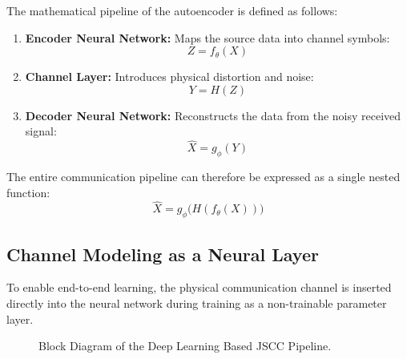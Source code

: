 \documentclass[10pt, conference]{IEEEtran}
\begin{document}
The mathematical pipeline of the autoencoder is defined as follows:
\begin{enumerate}
    \item \textbf{Encoder Neural Network:} Maps the source data into channel symbols:
    \begin{equation}
        Z = f_\theta(X)
    \end{equation}
    \item \textbf{Channel Layer:} Introduces physical distortion and noise:
    \begin{equation}
        Y = H(Z)
    \end{equation}
    \item \textbf{Decoder Neural Network:} Reconstructs the data from the noisy received signal:
    \begin{equation}
        \hat{X} = g_\phi(Y)
    \end{equation}
\end{enumerate}
The entire communication pipeline can therefore be expressed as a single nested function:
\begin{equation}
    \hat{X} = g_\phi\Big(H(f_\theta(X))\Big)
\end{equation}

\subsection{\textbf{Channel Modeling as a Neural Layer}}
To enable end-to-end learning, the physical communication channel is inserted directly into the neural network during training as a non-trainable parameter layer. 

\begin{figure}[h]
\centering
{}
\caption{Block Diagram of the Deep Learning Based JSCC Pipeline.}
\label{fig:jscc_pipeline}
\end{figure}
\end{document}
